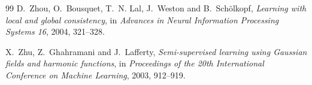\documentclass[reqno,11pt]{amsart}
\numberwithin{equation}{section}
\theoremstyle{definition}
\theoremstyle{remark}
\begin{document}
\begin{thebibliography}{99}
D.~Zhou, O.~Bousquet, T.~N. Lal, J.~Weston and B.~Sch\"olkopf,
\emph{Learning with local and global consistency},
in \emph{Advances in Neural Information Processing Systems 16}, 2004, 321--328.

X.~Zhu, Z.~Ghahramani and J.~Lafferty,
\emph{Semi-supervised learning using Gaussian fields and harmonic functions},
in \emph{Proceedings of the 20th International Conference on Machine Learning}, 2003, 912--919.

\end{thebibliography}
\end{document}
